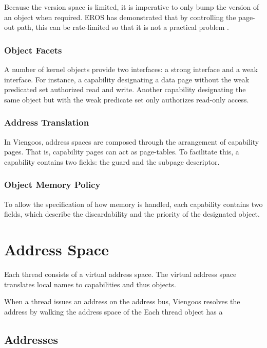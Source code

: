 Because the version space is limited, it is imperative to only bump
the version of an object when required.  EROS has demonstrated that by
controlling the page-out path, this can be rate-limited so that it is
not a practical problem \cite{citation-needed}.

\subsubsection{Object Facets}

A number of kernel objects provide two interfaces: a strong interface
and a weak interface.  For instance, a capability designating a data
page without the weak predicated set authorized read and write.
Another capability designating the same object but with the weak
predicate set only authorizes read-only access.

\subsubsection{Address Translation}

In Viengoos, address spaces are composed through the arrangement of
capability pages.  That is, capability pages can act as page-tables.
To facilitate this, a capability contains two fields: the guard and
the subpage descriptor.

\subsubsection{Object Memory Policy}

To allow the specification of how memory is handled, each capability
contains two fields, which describe the discardability and the
priority of the designated object.

\section{Address Space}

Each thread consists of a virtual address space.  The virtual address
space translates local names to capabilities and thus objects.

When a thread issues an address on the address bus, Viengoos resolves
the address by walking the address space of the Each thread object has
a

\subsection{Addresses}

